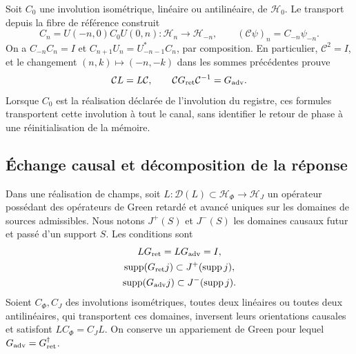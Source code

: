 Soit \(C_0\) une involution isométrique, linéaire ou antilinéaire, de \(\mathcal H_0\). Le transport depuis la fibre de référence construit
\[
 C_n=U(-n,0)C_0U(0,n):\mathcal H_n\longrightarrow\mathcal H_{-n},
 \qquad (\mathcal C\psi)_n=C_{-n}\psi_{-n}.
\]
On a \(C_{-n}C_n=I\) et \(C_{n+1}U_n=U_{-n-1}^*C_n\), par composition. En particulier, \(\mathcal C^2=I\), et le changement \((n,k)\mapsto(-n,-k)\) dans les sommes précédentes prouve
\begin{equation}
 \mathcal C L=L\mathcal C,\qquad
 \mathcal C G_{\rm ret}\mathcal C^{-1}=G_{\rm adv}.
 \label{vii:eq:intercambio-green-cronologico}
\end{equation}
Lorsque \(C_0\) est la réalisation déclarée de l'involution du registre, ces formules transportent cette involution à tout le canal, sans identifier le retour de phase à une réinitialisation de la mémoire.

\subsection{Échange causal et décomposition de la réponse}
\label{vii:subsec:green-realizacion-campos}

Dans une réalisation de champs, soit
\(L:\mathcal D(L)\subset\mathcal H_\Phi\to\mathcal H_J\)
un opérateur possédant des opérateurs de Green retardé et avancé uniques sur les domaines de
sources admissibles. Nous notons \(J^+(S)\) et \(J^-(S)\) les
domaines causaux futur et passé d'un support \(S\). Les conditions sont
\[
 \begin{gathered}
 LG_{\rm ret}=LG_{\rm adv}=I,\\
 \operatorname{supp}(G_{\rm ret}j)\subset J^+(\operatorname{supp}j),\\
 \operatorname{supp}(G_{\rm adv}j)\subset J^-(\operatorname{supp}j).
 \end{gathered}
\]
Soient \(C_\Phi,C_J\) des involutions isométriques, toutes deux linéaires ou toutes deux
antilinéaires, qui transportent ces domaines,
inversent leurs orientations causales et satisfont
\(LC_\Phi=C_JL\). On conserve un appariement de Green pour lequel
\(G_{\rm adv}=G_{\rm ret}^{\dagger}\).


